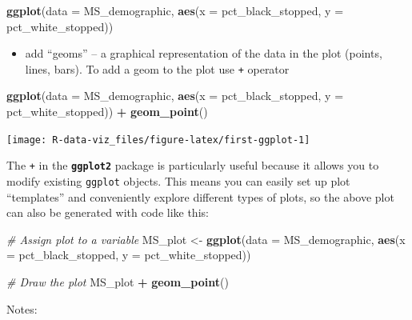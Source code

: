 \documentclass[]{book}
\newenvironment{Shaded}{\begin{snugshade}}{\end{snugshade}}
\newcommand{\KeywordTok}[1]{\textcolor[rgb]{0.13,0.29,0.53}{\textbf{#1}}}
\newcommand{\DataTypeTok}[1]{\textcolor[rgb]{0.13,0.29,0.53}{#1}}
\newcommand{\StringTok}[1]{\textcolor[rgb]{0.31,0.60,0.02}{#1}}
\newcommand{\CommentTok}[1]{\textcolor[rgb]{0.56,0.35,0.01}{\textit{#1}}}
\newcommand{\OperatorTok}[1]{\textcolor[rgb]{0.81,0.36,0.00}{\textbf{#1}}}
\newcommand{\NormalTok}[1]{#1}
\providecommand{\tightlist}{%
  \setlength{\itemsep}{0pt}\setlength{\parskip}{0pt}}
\theoremstyle{definition}
\theoremstyle{definition}
\theoremstyle{definition}
\theoremstyle{remark}
\begin{document}
\begin{Shaded}
\begin{Highlighting}[]
\KeywordTok{ggplot}\NormalTok{(}\DataTypeTok{data =}\NormalTok{ MS_demographic, }\KeywordTok{aes}\NormalTok{(}\DataTypeTok{x =}\NormalTok{ pct_black_stopped, }\DataTypeTok{y =}\NormalTok{ pct_white_stopped))}
\end{Highlighting}
\end{Shaded}

\begin{itemize}
\tightlist
\item
  add ``geoms'' -- a graphical representation of the data in the plot
  (points, lines, bars). To add a geom to the plot use \texttt{+}
  operator
\end{itemize}

\begin{Shaded}
\begin{Highlighting}[]
\KeywordTok{ggplot}\NormalTok{(}\DataTypeTok{data =}\NormalTok{ MS_demographic, }\KeywordTok{aes}\NormalTok{(}\DataTypeTok{x =}\NormalTok{ pct_black_stopped, }\DataTypeTok{y =}\NormalTok{ pct_white_stopped)) }\OperatorTok{+}
\StringTok{  }\KeywordTok{geom_point}\NormalTok{()}
\end{Highlighting}
\end{Shaded}

\texttt{[image: R-data-viz\_files/figure-latex/first-ggplot-1]}

The \texttt{+} in the \textbf{\texttt{ggplot2}} package is particularly
useful because it allows you to modify existing \texttt{ggplot} objects.
This means you can easily set up plot ``templates'' and conveniently
explore different types of plots, so the above plot can also be
generated with code like this:

\begin{Shaded}
\begin{Highlighting}[]
\CommentTok{# Assign plot to a variable}
\NormalTok{MS_plot <-}\StringTok{ }\KeywordTok{ggplot}\NormalTok{(}\DataTypeTok{data =}\NormalTok{ MS_demographic, }\KeywordTok{aes}\NormalTok{(}\DataTypeTok{x =}\NormalTok{ pct_black_stopped, }\DataTypeTok{y =}\NormalTok{ pct_white_stopped))}

\CommentTok{# Draw the plot}
\NormalTok{MS_plot }\OperatorTok{+}\StringTok{ }\KeywordTok{geom_point}\NormalTok{()}
\end{Highlighting}
\end{Shaded}

Notes:
\end{document}
